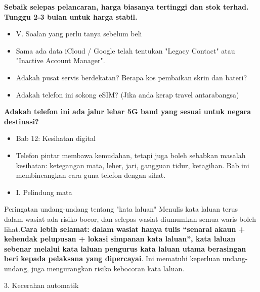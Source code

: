 \textbf{Sebaik selepas pelancaran, harga biasanya tertinggi dan stok terhad. Tunggu 2-3 bulan untuk harga stabil.}

\begin{itemize}
  \item V. Soalan yang perlu tanya sebelum beli
  \item Sama ada data iCloud / Google telah tentukan "Legacy Contact" atau "Inactive Account Manager".
  \item Adakah pusat servis berdekatan? Berapa kos pembaikan skrin dan bateri?
  \item Adakah telefon ini sokong eSIM? (Jika anda kerap travel antarabangsa)
\end{itemize}

\textbf{Adakah telefon ini ada jalur lebar 5G band yang sesuai untuk negara destinasi?}

\begin{itemize}
  \item Bab 12: Kesihatan digital
  \item Telefon pintar membawa kemudahan, tetapi juga boleh sebabkan masalah kesihatan: ketegangan mata, leher, jari, gangguan tidur, ketagihan. Bab ini membincangkan cara guna telefon dengan sihat.
  \item I. Pelindung mata
\end{itemize}

\begin{tcbwarn}{Peringatan undang-undang tentang "kata laluan"}
Menulis kata laluan terus dalam wasiat ada risiko bocor, dan selepas wasiat diumumkan semua waris boleh lihat.\textbf{Cara lebih selamat: dalam wasiat hanya tulis “senarai akaun + kehendak pelupusan + lokasi simpanan kata laluan”, kata laluan sebenar melalui kata laluan pengurus kata laluan utama berasingan beri kepada pelaksana yang dipercayai}. Ini mematuhi keperluan undang-undang, juga mengurangkan risiko kebocoran kata laluan.

\end{tcbwarn}


3. Kecerahan automatik


